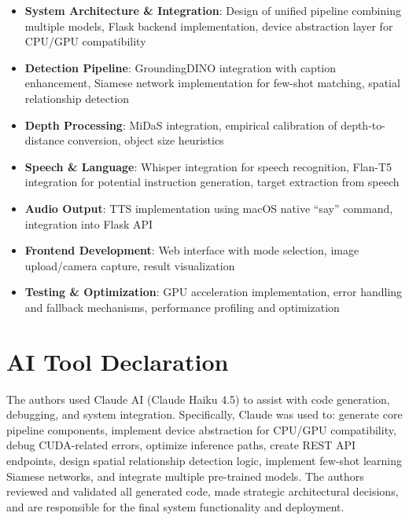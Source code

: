 \documentclass{article}
\begin{document}
\begin{itemize}
    \item \textbf{System Architecture \& Integration}: Design of unified pipeline combining multiple models, Flask backend implementation, device abstraction layer for CPU/GPU compatibility
    \item \textbf{Detection Pipeline}: GroundingDINO integration with caption enhancement, Siamese network implementation for few-shot matching, spatial relationship detection
    \item \textbf{Depth Processing}: MiDaS integration, empirical calibration of depth-to-distance conversion, object size heuristics
    \item \textbf{Speech \& Language}: Whisper integration for speech recognition, Flan-T5 integration for potential instruction generation, target extraction from speech
    \item \textbf{Audio Output}: TTS implementation using macOS native ``say'' command, integration into Flask API
    \item \textbf{Frontend Development}: Web interface with mode selection, image upload/camera capture, result visualization
    \item \textbf{Testing \& Optimization}: GPU acceleration implementation, error handling and fallback mechanisms, performance profiling and optimization
\end{itemize}

\section{AI Tool Declaration}

The authors used Claude AI (Claude Haiku 4.5) to assist with code generation, debugging, and system integration. Specifically, Claude was used to: generate core pipeline components, implement device abstraction for CPU/GPU compatibility, debug CUDA-related errors, optimize inference paths, create REST API endpoints, design spatial relationship detection logic, implement few-shot learning Siamese networks, and integrate multiple pre-trained models. The authors reviewed and validated all generated code, made strategic architectural decisions, and are responsible for the final system functionality and deployment.
\end{document}
